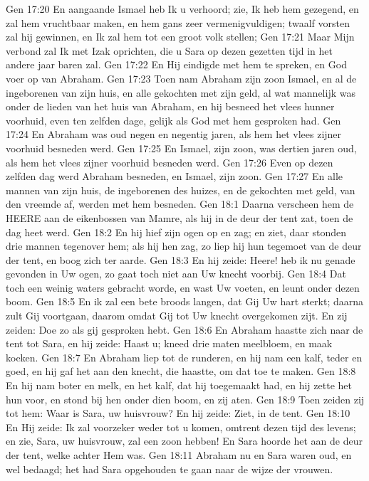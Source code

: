 Gen 17:20  En aangaande Ismael heb Ik u verhoord; zie, Ik heb hem gezegend, en zal hem vruchtbaar maken, en hem gans zeer vermenigvuldigen; twaalf vorsten zal hij gewinnen, en Ik zal hem tot een groot volk stellen;
Gen 17:21  Maar Mijn verbond zal Ik met Izak oprichten, die u Sara op dezen gezetten tijd in het andere jaar baren zal.
Gen 17:22  En Hij eindigde met hem te spreken, en God voer op van Abraham.
Gen 17:23  Toen nam Abraham zijn zoon Ismael, en al de ingeborenen van zijn huis, en alle gekochten met zijn geld, al wat mannelijk was onder de lieden van het huis van Abraham, en hij besneed het vlees hunner voorhuid, even ten zelfden dage, gelijk als God met hem gesproken had.
Gen 17:24  En Abraham was oud negen en negentig jaren, als hem het vlees zijner voorhuid besneden werd.
Gen 17:25  En Ismael, zijn zoon, was dertien jaren oud, als hem het vlees zijner voorhuid besneden werd.
Gen 17:26  Even op dezen zelfden dag werd Abraham besneden, en Ismael, zijn zoon.
Gen 17:27  En alle mannen van zijn huis, de ingeborenen des huizes, en de gekochten met geld, van den vreemde af, werden met hem besneden.
Gen 18:1  Daarna verscheen hem de HEERE aan de eikenbossen van Mamre, als hij in de deur der tent zat, toen de dag heet werd.
Gen 18:2  En hij hief zijn ogen op en zag; en ziet, daar stonden drie mannen tegenover hem; als hij hen zag, zo liep hij hun tegemoet van de deur der tent, en boog zich ter aarde.
Gen 18:3  En hij zeide: Heere! heb ik nu genade gevonden in Uw ogen, zo gaat toch niet aan Uw knecht voorbij.
Gen 18:4  Dat toch een weinig waters gebracht worde, en wast Uw voeten, en leunt onder dezen boom.
Gen 18:5  En ik zal een bete broods langen, dat Gij Uw hart sterkt; daarna zult Gij voortgaan, daarom omdat Gij tot Uw knecht overgekomen zijt. En zij zeiden: Doe zo als gij gesproken hebt.
Gen 18:6  En Abraham haastte zich naar de tent tot Sara, en hij zeide: Haast u; kneed drie maten meelbloem, en maak koeken.
Gen 18:7  En Abraham liep tot de runderen, en hij nam een kalf, teder en goed, en hij gaf het aan den knecht, die haastte, om dat toe te maken.
Gen 18:8  En hij nam boter en melk, en het kalf, dat hij toegemaakt had, en hij zette het hun voor, en stond bij hen onder dien boom, en zij aten.
Gen 18:9  Toen zeiden zij tot hem: Waar is Sara, uw huisvrouw? En hij zeide: Ziet, in de tent.
Gen 18:10  En Hij zeide: Ik zal voorzeker weder tot u komen, omtrent dezen tijd des levens; en zie, Sara, uw huisvrouw, zal een zoon hebben! En Sara hoorde het aan de deur der tent, welke achter Hem was.
Gen 18:11  Abraham nu en Sara waren oud, en wel bedaagd; het had Sara opgehouden te gaan naar de wijze der vrouwen.
